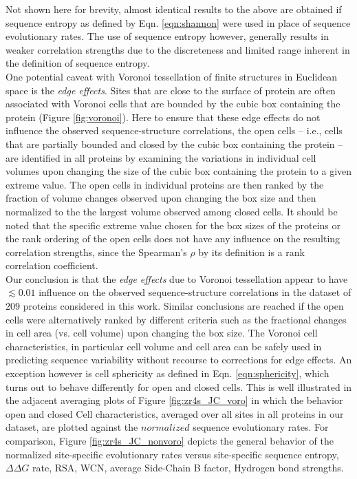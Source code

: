 \documentclass[11pt]{article}
\begin{document}
    Not shown here for brevity, almost identical results to the above are obtained if sequence entropy as defined by Eqn. \ref{eqn:shannon} were used in place of sequence evolutionary rates. The use of sequence entropy however, generally results in weaker correlation strengths due to the discreteness and limited range inherent in the definition of sequence entropy. \\

    One potential caveat with Voronoi tessellation of finite structures in Euclidean space is the {\it edge effects}. Sites that are close to the surface of protein are often associated with Voronoi cells that are bounded by the cubic box containing the protein (Figure \ref{fig:voronoi}). Here to ensure that these edge effects do not influence the observed sequence-structure correlations, the open cells -- i.e., cells that are partially bounded and closed by the cubic box containing the protein -- are identified in all proteins by examining the variations in individual cell volumes upon changing the size of the cubic box containing the protein to a given extreme value. The open cells in individual proteins are then ranked by the fraction of volume changes observed upon changing the box size and then normalized to the the largest volume observed among closed cells. It should be noted that the specific extreme value chosen for the box sizes of the proteins or the rank ordering of the open cells does not have any influence on the resulting correlation strengths, since the Spearman's $\rho$ by its definition is a rank correlation coefficient. \\

    Our conclusion is that the {\it edge effects} due to Voronoi tessellation appear to have $\lesssim0.01$ influence on the observed sequence-structure correlations in the dataset of $209$ proteins considered in this work. Similar conclusions are reached if the open cells were alternatively ranked by different criteria such as the fractional changes in cell area (vs. cell volume) upon changing the box size. The Voronoi cell characteristics, in particular cell volume and cell area can be safely used in predicting sequence variability without recourse to corrections for edge effects. An exception however is cell sphericity as defined in Eqn. \ref{eqn:sphericity}, which turns out to behave differently for open and closed cells. This is well illustrated in the adjacent averaging plots of Figure \ref{fig:zr4s_JC_voro} in which the behavior open and closed Cell characteristics, averaged over all sites in all proteins in our dataset, are plotted against the $normalized$ sequence evolutionary rates. For comparison, Figure \ref{fig:zr4s_JC_nonvoro} depicts the general behavior of the normalized site-specific evolutionary rates versus site-specific sequence entropy, $\Delta\Delta G$ rate, RSA, WCN, average Side-Chain B factor, Hydrogen bond strengths. \\
\end{document}
